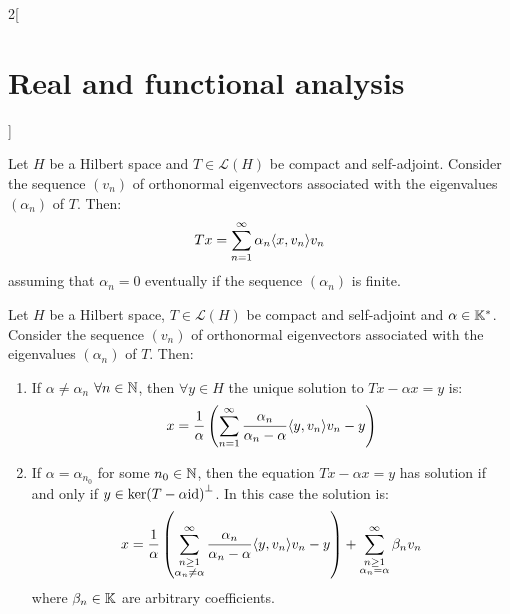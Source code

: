 \documentclass[../../../main_math.tex]{subfiles}
\begin{document}
\begin{multicols}{2}[\section{Real and functional analysis}]
\begin{lemma}
  \end{lemma}
  \begin{theorem} \label{RFA_representationtheorem}
    Let $H$ be a Hilbert space and $T\in\mathcal{L}(H)$ be compact and self-adjoint. Consider the sequence $(v_n)$ of orthonormal eigenvectors associated with the eigenvalues $(\alpha_n)$ of $T$. Then: $$Tx=\sum_{n=1}^\infty\alpha_n{\left\langle x,v_n\right\rangle}v_n$$ assuming that $\alpha_n=0$ eventually if the sequence $(\alpha_n)$ is finite.
  \end{theorem}
  \begin{theorem}
    Let $H$ be a Hilbert space, $T\in\mathcal{L}(H)$ be compact and self-adjoint and $\alpha\in\mathbb{K}^*$. Consider the sequence $(v_n)$ of orthonormal eigenvectors associated with the eigenvalues $(\alpha_n)$ of $T$. Then:
    \begin{enumerate}
      \item If $\alpha\ne\alpha_n$ $\forall n\in\mathbb{N}$, then $\forall y\in H$ the unique solution to $Tx-\alpha x=y$ is: $$x=\frac{1}{\alpha}\left(\sum_{n=1}^\infty\frac{\alpha_n}{\alpha_n-\alpha}{\left\langle y,v_n\right\rangle}v_n -y\right)$$
      \item If $\alpha=\alpha_{n_0}$ for some $n_0\in\mathbb{N}$, then the equation $Tx-\alpha x=y$ has solution if and only if $y\in {\ker(T-\alpha \mathrm{id})}^\perp$. In this case the solution is: $$x=\frac{1}{\alpha}\left(\sum_{\substack{n\geq 1\\\alpha_n\ne\alpha}}^\infty\frac{\alpha_n}{\alpha_n-\alpha}{\left\langle y,v_n\right\rangle}v_n -y\right) + \sum_{\substack{n\geq 1\\\alpha_n=\alpha}}^\infty \beta_nv_n$$
            where $\beta_n\in\mathbb{K}$ are arbitrary coefficients.
    \end{enumerate}
  \end{theorem}
\end{multicols}
\end{document}
